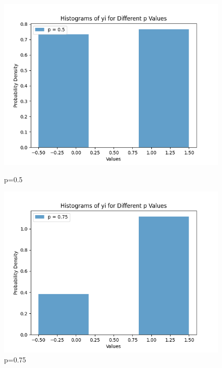 \documentclass{article}
\begin{document}
\begin{figure}
  \centering
  \begin{minipage}[b]{0.4\textwidth}
    \includegraphics[width=\textwidth]{assets/pvalue2.png}
    \caption{p=0.5}
  \end{minipage}
  \hfill
  \begin{minipage}[b]{0.4\textwidth}
    \includegraphics[width=\textwidth]{assets/pvalue3.png}
    \caption{p=0.75}
  \end{minipage}
\end{figure}
\end{document}
